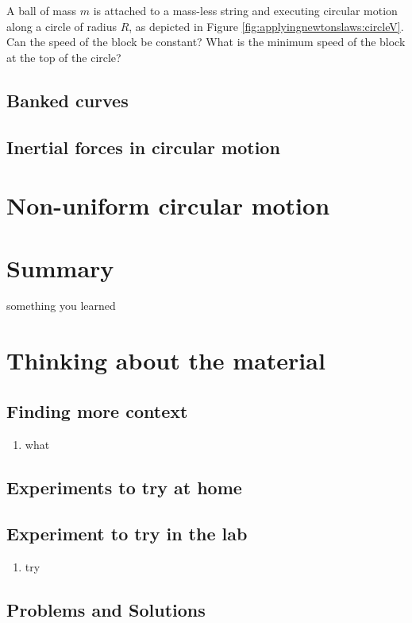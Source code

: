 \begin{example}{A ball of mass $m$ is attached to a mass-less string and executing circular motion along a circle of radius $R$, as depicted in Figure \ref{fig:applyingnewtonslaws:circleV}. Can the speed of the block be constant? What is the minimum speed of the block at the top of the circle?}
\end{example}

\subsection{Banked curves}

\subsection{Inertial forces in circular motion}

\section{Non-uniform circular motion}











\newpage
\section{Summary}
\vspace{1cm}
\begin{chapterSummary}
\item something you learned
\end{chapterSummary}


\section{Thinking about the material}

\subsection{Finding more context}
\begin{enumerate}
\item what
\end{enumerate}

\subsection{Experiments to try at home}

\subsection{Experiment to try in the lab}
\begin{enumerate}
\item try
\end{enumerate}

\subsection{Problems and Solutions}
 